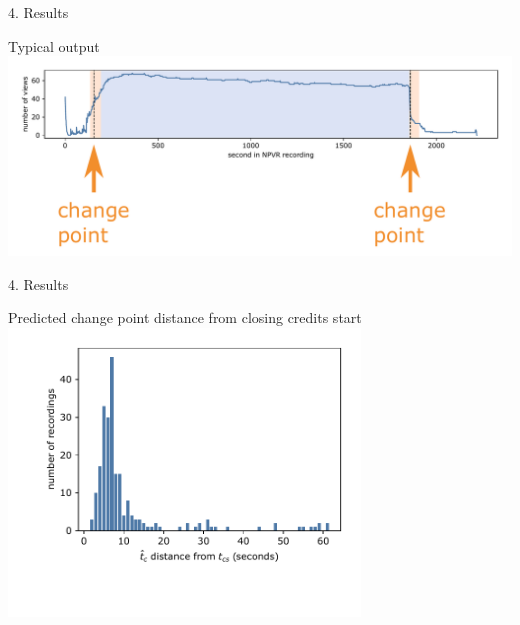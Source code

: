 \documentclass[first=orange,second=blue,logo=blueque]{aaltoslides}
\begin{document}

\begin{frame}{4. Results}
    \begin{block}{{\color{black}Typical output}}
        \includegraphics[width=1\textwidth]{figures/output1.pdf}
    \end{block}
\end{frame}


\begin{frame}{4. Results}
    \begin{block}{{\color{black}Predicted change point distance from closing credits start}}
        \includegraphics[width=0.7\textwidth]{figures/result_absolute0.pdf}
    \end{block}
\end{frame}

\end{document}
